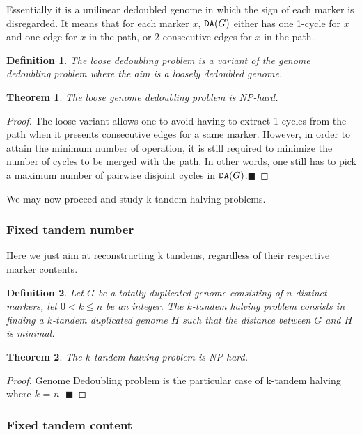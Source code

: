 \documentclass[11pt,final,twoside,nofrench]{thlifl}
\newcommand{\qed}{\ensuremath{\blacksquare}}
\newcommand{\DA}{\ensuremath{\mbox{\texttt{DA}}}}
\newtheorem{proof}{Proof}
\newtheorem{theorem}{Theorem}
\newtheorem{definition}{Definition}
\begin{document}
Essentially it is a unilinear dedoubled genome in which the sign of each marker is disregarded. It means that for each marker $x$, $\DA(G)$ either has one 1-cycle for $x$ and one edge for $x$ in the path, or 2 consecutive edges for $x$ in the path.

\begin{definition}
The \emph{loose dedoubling problem} is a variant of the genome dedoubling problem where the aim is a loosely dedoubled genome. 
\end{definition}

\begin{theorem}
The loose genome dedoubling problem is NP-hard.
\end{theorem}
\begin{proof}
The loose variant allows one to avoid having to extract 1-cycles from the path when it presents consecutive edges for a same marker. However, in order to attain the minimum number of operation, it is still required to minimize the number of cycles to be merged with the path. In other words, one still has to pick a maximum number of pairwise disjoint cycles in $\DA(G)$.\qed
\end{proof}

We may now proceed and study k-tandem halving problems.

\subsubsection{Fixed tandem number}

Here we just aim at reconstructing k tandems, regardless of their respective marker contents.

\begin{definition}
    Let $G$ be a totally duplicated genome consisting of $n$ distinct markers, let $0 < k \leq n$ be an
    integer. The \emph{$k$-tandem halving} problem consists in finding
    a $k$-tandem duplicated genome $H$ such that the distance between
    $G$ and $H$ is minimal.
\end{definition}

\begin{theorem}
The $k$-tandem halving problem is NP-hard.
\end{theorem}

\begin{proof}
Genome Dedoubling problem is the particular case of k-tandem halving where $k$ = $n$. \qed
\end{proof}

\subsubsection{Fixed tandem content}
\end{document}
